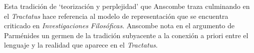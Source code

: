 Esta tradición de \enquote*{teorización y perplejidad} que Anscombe traza culminando en el \emph{Tractatus} hace referencia al modelo de representación que se encuentra criticado en \emph{Investigaciones Filosóficas}. Anscombe nota en el argumento de Parménides un germen de la tradición subyacente a la conexión a priori entre el lenguaje y la realidad que aparece en el \emph{Tractatus}.


